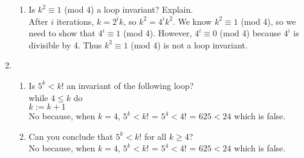 \documentclass[12pt]{article}
\begin{document}
\begin{enumerate}
\begin{enumerate}
	\item Is $k^2\equiv 1$ (mod 4) a loop invariant? Explain.\\
	After $i$ iterations, $k=2^ik$, so $k^2 = 4^ik^2$. We know $k^2\equiv 1$ (mod 4), so we need to 		show that $4^i\equiv 1$ (mod 4). However, $4^i\equiv 0$ (mod 4) because $4^i$ is divisible by 4. Thus 
	 $k^2\equiv 1$ (mod 4) is not a loop invariant.
	\end{enumerate}
	
\setcounter{enumi}{21}
\item
	\begin{enumerate}
	\item Is $5^k < k!$ an invariant of the following loop?\\
	
	while $4\leq k$ do\\
	$k:=k+1$\\
	
	No because, when $k=4$, $5^k < k!$ = $5^4<4!$ = $625<24$ which is false.

	\item Can you conclude that $5^k < k!$ for all $k\geq4$?\\
	No because, when $k=4$, $5^k < k!$ = $5^4<4!$ = $625<24$ which is false.
	\end{enumerate}
\end{enumerate}

\end{document}
